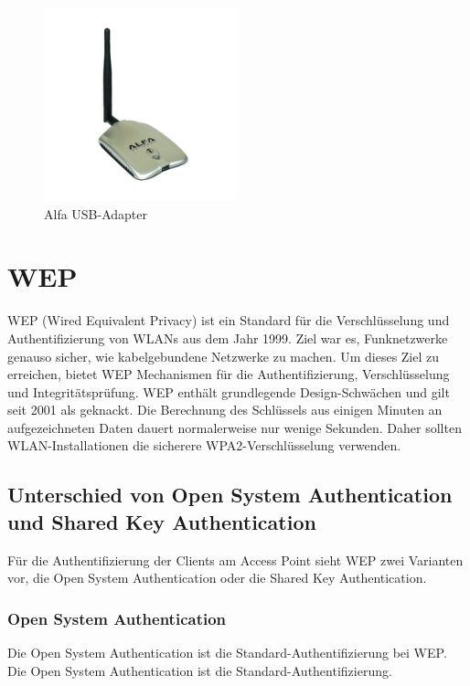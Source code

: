 \begin{figure}[H]
	\centering
	\includegraphics[width=0.5\textwidth]{images/WLAN/AlfaUSB-Adapter.jpg}
	\caption{Alfa USB-Adapter}
	\label{fig:Alfa USB-Adapter}
\end{figure}
\newpage

\section{WEP}

WEP (Wired Equivalent Privacy) ist ein Standard für die Verschlüsselung und Authentifizierung
von WLANs aus dem Jahr 1999. Ziel war es, Funknetzwerke genauso sicher, wie kabelgebundene Netzwerke zu machen. Um dieses Ziel zu erreichen, bietet WEP Mechanismen für die Authentifizierung, Verschlüsselung und Integritätsprüfung. WEP enthält grundlegende Design-Schwächen und gilt seit 2001 als geknackt. Die Berechnung des Schlüssels aus einigen Minuten an aufgezeichneten Daten dauert normalerweise nur wenige Sekunden. Daher sollten WLAN-Installationen die sicherere WPA2-Verschlüsselung verwenden.

\subsection{Unterschied von Open System Authentication und Shared Key Authentication}

Für die Authentifizierung der Clients am Access Point sieht WEP zwei Varianten vor, die Open System Authentication oder die Shared Key Authentication.

	\subsubsection{Open System Authentication}
	Die Open System Authentication ist die Standard-Authentifizierung bei WEP. Die Open System Authentication ist die Standard-Authentifizierung.

